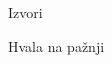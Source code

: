 \documentclass[aspectratio=43, hyperref={pdftex, hyperfootnotes=false}]{beamer}
\begin{document}

%   

\begin{frame}[allowframebreaks, t]{Izvori}
    \tiny %
    \tiny
\end{frame}

\begin{frame}[standout]
    Hvala na pažnji
\end{frame}
\end{document}
